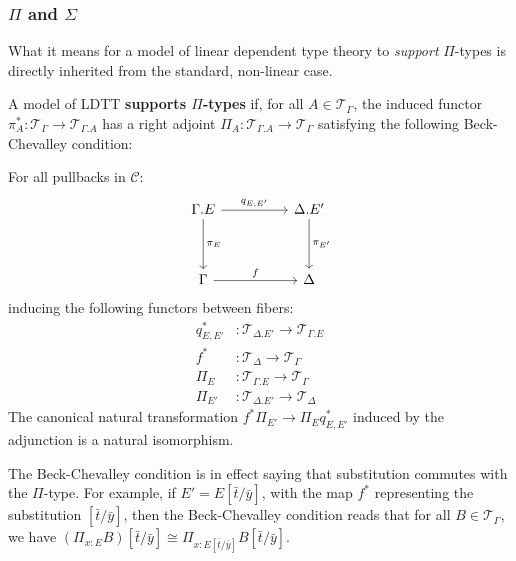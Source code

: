 \documentclass[a4paper,english]{lipics-v2018}
\begin{document}
\subsubsection{$\Pi$ and $\Sigma$}
What it means for a model of linear dependent type theory to \textit{support} $\Pi$-types is directly inherited from the standard, non-linear case.
\begin{definition}A model of LDTT \textbf{supports $\Pi$-types} if, for all $A \in \mathcal{T}_{\Gamma}$, the induced functor $\pi_A^* : \mathcal{T}_{\Gamma} \to \mathcal{T}_{\Gamma.A}$ has a right adjoint $\Pi_A : \mathcal{T}_{\Gamma.A} \to \mathcal{T}_{\Gamma}$ satisfying the following Beck-Chevalley condition:

  
For all pullbacks in $\mathcal{C}$:
  \begin{equation}\label{pb-diag}
    \begin{tikzcd}[row sep=huge, column sep=huge]
    \Gamma.E \ar[d, "\pi_E"] \ar[r, "q_{E, E'}"] & \Delta.E' \ar[d, "\pi_{E'}"] \\
    \Gamma \ar[r, "f"] & \Delta
    \end{tikzcd}
  \end{equation}
inducing the following functors between fibers:
\[
  \begin{split}
    q^*_{E, E'} &: \mathcal{T}_{\Delta.E'} \to \mathcal{T}_{\Gamma.E}\\
    f^* &: \mathcal{T}_{\Delta} \to \mathcal{T}_{\Gamma}\\
    \Pi_E &: \mathcal{T}_{\Gamma.E} \to \mathcal{T}_{\Gamma}\\
    \Pi_{E'} &: \mathcal{T}_{\Delta.E'} \to \mathcal{T}_{\Delta}
  \end{split}    
\]
The canonical natural transformation $f^*\Pi_{E'} \to \Pi_{E}q^*_{E, E'}$ induced by the adjunction is a natural isomorphism.


\end{definition}
The Beck-Chevalley condition is in effect saying that substitution commutes with the $\Pi$-type. For example, if $E' = E[\bar t/\bar y]$, with the map $f^*$ representing the substitution $[\bar t/\bar y]$, then the Beck-Chevalley condition reads that for all $B \in \mathcal{T}_{\Gamma}$, we have $(\Pi_{x : E}B)[\bar t/\bar y] \cong \Pi_{x : E[\bar t/\bar y]}B[\bar t/\bar y]$.
\end{document}
